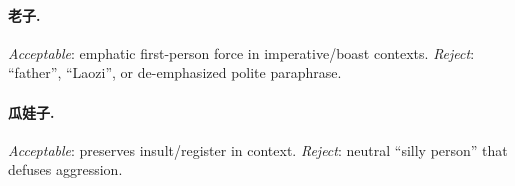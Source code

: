 \documentclass[11pt]{article}
\begin{document}
\paragraph{老子.}
\emph{Acceptable}: emphatic first-person force in imperative/boast contexts.
\emph{Reject}: ``father'', ``Laozi'', or de-emphasized polite paraphrase.

\paragraph{瓜娃子.}
\emph{Acceptable}: preserves insult/register in context.
\emph{Reject}: neutral ``silly person'' that defuses aggression.
\end{document}
